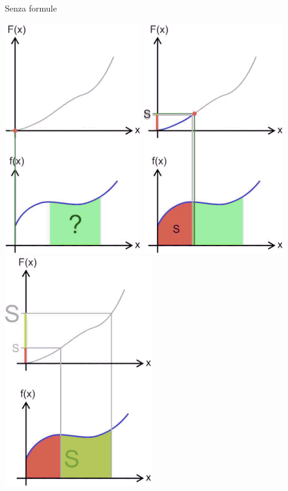 \documentclass[8pt]{beamer}
\begin{document}
\begin{frame}{Senza formule}
\begin{center}
    \includegraphics[scale=.2]{Z-242.png}
    \includegraphics[scale=.2]{Z-287.png}
    \includegraphics[scale=.2]{Z-323.png}

\end{center}
\end{frame}
\end{document}
